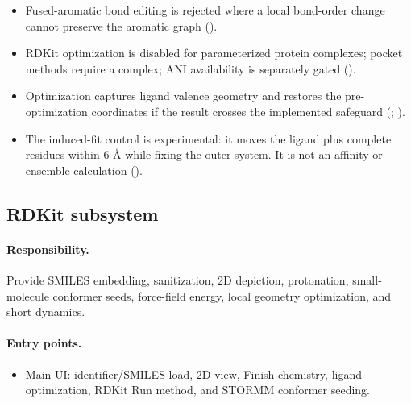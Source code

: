 \documentclass[11pt]{article}
\begin{document}
\begin{small}
\begin{itemize}[leftmargin=*]
\item Fused-aromatic bond editing is rejected where a local bond-order change cannot preserve the aromatic graph ().

\item RDKit optimization is disabled for parameterized protein complexes; pocket methods require a complex; ANI availability is separately gated ().

\end{itemize}

\begin{itemize}[leftmargin=*]

\item Optimization captures ligand valence geometry and restores the pre-optimization coordinates if the result crosses the implemented safeguard (; ).

\item The induced-fit control is experimental: it moves the ligand plus complete residues within 6 \AA{} while fixing the outer system. It is not an affinity or ensemble calculation ().

\end{itemize}

\subsection{RDKit subsystem}\label{appB:sec9}

\paragraph{Responsibility.}

Provide SMILES embedding, sanitization, 2D depiction, protonation, small-molecule conformer seeds, force-field energy, local geometry optimization, and short dynamics.

\paragraph{Entry points.}

\begin{itemize}[leftmargin=*]

\item Main UI: identifier/SMILES load, 2D view, Finish chemistry, ligand optimization, RDKit Run method, and STORMM conformer seeding.


\end{itemize}
\end{small}
\end{document}
